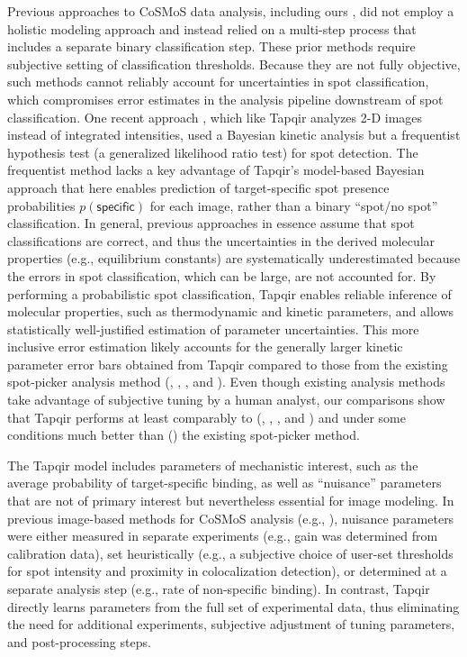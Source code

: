 Previous approaches to CoSMoS data analysis, including ours \citep{Friedman2015-nx}, did not employ a holistic modeling approach and instead relied on a multi-step process that includes a separate binary classification step.  These prior methods require subjective setting of classification thresholds.  Because they are not fully objective, such methods cannot reliably account for uncertainties in spot classification, which compromises error estimates in the analysis pipeline downstream of spot classification. One recent approach \citep{Smith2019-yb,Smith2015-gf}, which like Tapqir analyzes 2-D images instead of integrated intensities, used a Bayesian kinetic analysis but a frequentist hypothesis test (a generalized likelihood ratio test) for spot detection.  The frequentist method lacks a key advantage of Tapqir's model-based Bayesian approach that here enables prediction of target-specific spot presence probabilities $p(\mathsf{specific})$ for each image, rather than a binary ``spot/no spot'' classification.  In general, previous approaches in essence assume that spot classifications are correct, and thus the uncertainties in the derived molecular properties (e.g., equilibrium constants) are systematically underestimated because the errors in spot classification, which can be large, are not accounted for. By performing a probabilistic spot classification, Tapqir enables reliable inference of molecular properties, such as thermodynamic and kinetic parameters, and allows statistically  well-justified estimation of parameter uncertainties.  This more inclusive error estimation likely accounts for the generally larger kinetic parameter error bars obtained from Tapqir compared to those from the existing spot-picker analysis method (, , , and ). Even though existing analysis methods take advantage of subjective tuning by a human analyst, our comparisons show that Tapqir performs at least comparably to (, , , and ) and under some conditions much better than () the existing spot-picker method.

The Tapqir model includes parameters of mechanistic interest, such as the average probability of target-specific binding, as well as ``nuisance'' parameters that are not of primary interest but nevertheless essential for image modeling. In previous image-based methods for CoSMoS analysis (e.g., \citep{Friedman2015-nx,Smith2019-yb}), nuisance parameters were either measured in separate experiments (e.g., gain was determined from calibration data), set heuristically (e.g., a subjective choice of user-set thresholds for spot intensity and proximity in colocalization detection), or determined at a separate analysis step (e.g., rate of non-specific binding). In contrast, Tapqir directly learns parameters from the full set of experimental data, thus eliminating the need for additional experiments, subjective adjustment of tuning parameters, and post-processing steps.

